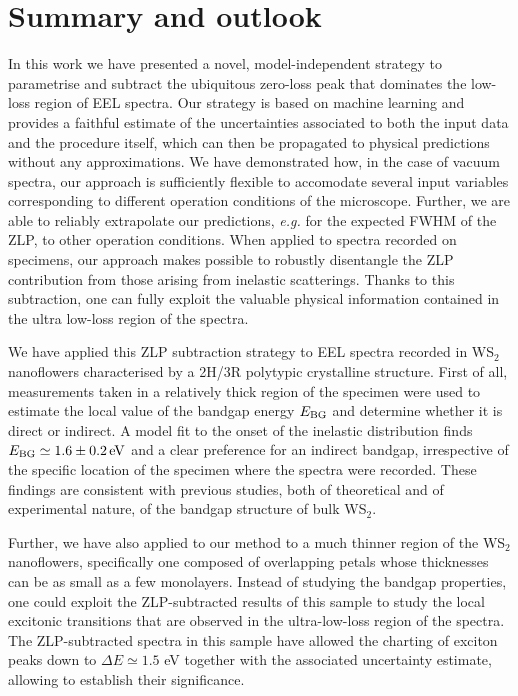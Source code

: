 \section{Summary and outlook}
\label{sec:summary}

In this work we have presented a novel, model-independent strategy to parametrise and subtract
the ubiquitous zero-loss peak that dominates  the low-loss region
of EEL spectra.
%
Our strategy is based on machine learning and provides a faithful estimate of the
uncertainties associated to both the input data and the procedure itself,
which can  then be propagated to physical predictions  without any  approximations.
%
We have demonstrated how, in the case of vacuum spectra, our approach
is sufficiently flexible to accomodate several input variables corresponding
to different operation conditions of the microscope.
%
Further, we are able  to reliably
extrapolate our predictions, {\it e.g.} for the  expected FWHM of the ZLP,
to other operation conditions.
%
When applied to spectra recorded on specimens, our approach
makes possible to robustly disentangle the ZLP contribution from
those arising from inelastic scatterings.
%
Thanks to this subtraction, one can fully exploit
the valuable physical information contained in the ultra low-loss region of
the spectra.

We have applied this ZLP subtraction
strategy to EEL spectra recorded in  WS$_2$ nanoflowers characterised by a
2H/3R polytypic crystalline structure.
%
First of all, measurements taken in a relatively
thick region of the specimen were used to estimate the local value of the bandgap energy $E_{\rm BG}$
and determine whether it is direct or indirect.
%
A model fit to the onset of the inelastic distribution finds $E_{\rm BG} \simeq 1.6 \pm 0.2\,{\rm eV}$ and
a clear preference for an indirect bandgap, irrespective of the specific location
of the specimen where the  spectra were recorded.
%
These findings are consistent with previous studies, both of theoretical
and of experimental nature, of the bandgap structure of bulk WS$_2$.

Further, we have also applied to our method to a much thinner region of the  WS$_2$ nanoflowers,
specifically one
composed of overlapping petals whose thicknesses can be as small as a few monolayers.
%
Instead of studying the bandgap properties, one could exploit the ZLP-subtracted results 
of this sample to study the local
excitonic transitions that are observed in the ultra-low-loss region of the spectra.
%
The ZLP-subtracted spectra in this sample have allowed
the charting of exciton peaks down to $\Delta E\simeq 1.5$ eV together with
the associated uncertainty estimate, allowing to establish their significance.


